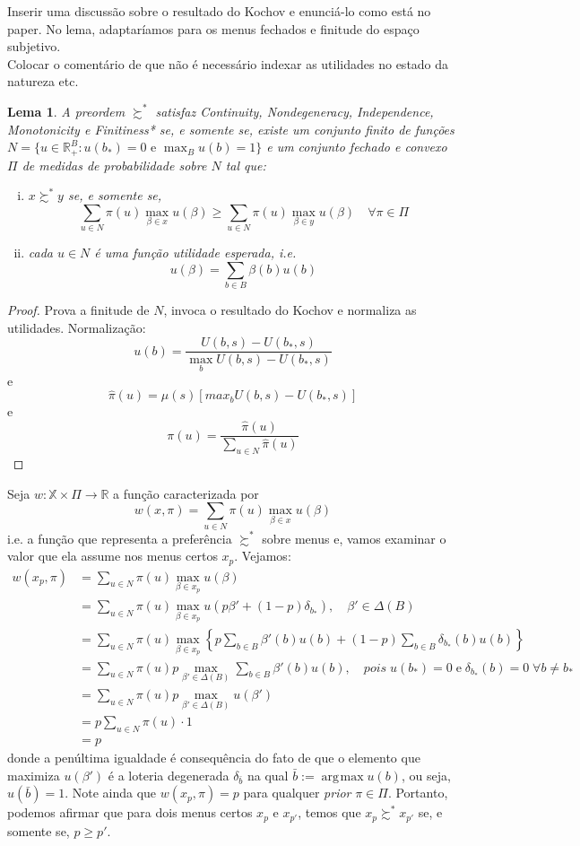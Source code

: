 \documentclass[11pt, a4paper]{article}
\theoremstyle{nonumberplain}
\newtheorem{proof}{Dem.}
\theoremstyle{plain}
\theoremstyle{plain}
\newtheorem{lemma}{Lema}
\DeclareMathOperator*{\argmax}{\arg\!\max}
\begin{document}
{\color{cadmiumgreen}Inserir uma discussão sobre o resultado do Kochov e enunciá-lo como está no paper. No lema, adaptaríamos para os menus fechados e finitude do espaço subjetivo.\\
Colocar o comentário de que não é necessário indexar as utilidades no estado da natureza etc.}


\begin{lemma} A preordem $\succsim^*$ satisfaz \emph{Continuity}, \emph{Nondegeneracy}, \emph{Independence}, \emph{Monotonicity} e \emph{Finitiness*} se, e somente se, existe um conjunto finito de funções $N=\{u \in \mathbb{R}^B_+:u(b_*)=0\text { e }\max_{B}u(b)=1\}$ e um conjunto fechado e convexo $\Pi$ de medidas de probabilidade sobre $N$ tal que:
\begin{enumerate}[(i)]
\item $x\succsim^* y$ se, e somente se, $$ \sum_{u\in N} \pi(u)\max_{\beta\in x}u(\beta) \geq \sum_{u\in N} \pi(u)\max_{\beta\in y}u(\beta)\quad \forall\pi\in\Pi$$  
\item cada $u \in N$ é uma função utilidade esperada, i.e. $$u(\beta)=\sum_{b\in B} \beta(b)u(b)$$ 
\end{enumerate}     
\end{lemma}
\begin{proof}
Prova a finitude de $N$, invoca o resultado do Kochov e normaliza as utilidades.
Normalização:$$u(b)=\frac{U(b,s)-U(b_*,s)}{\max_b U(b,s)-U(b_*,s)}$$ e $$ \hat{\pi}(u)=\mu(s)\left[max_b U(b,s)-U(b_*,s)\right]$$ e $$\pi(u)=\frac{\hat{\pi}(u)}{\sum_{u\in N}\hat{\pi}(u)}$$ 
\end{proof}

Seja $w:\mathbb{X}\times \Pi\rightarrow \mathbb{R}$ a função caracterizada por $$w(x,\pi)=\sum_{u\in N} \pi(u)\max_{\beta\in x}u(\beta)$$ i.e. a função que representa a preferência $\succsim^*$ sobre menus e, vamos examinar o valor que ela assume nos menus certos $x_p$. Vejamos:
\begin{align*}
w(x_p,\pi)&=\sum_{u\in N} \pi(u)\max_{\beta\in x_{p}}u(\beta)\\
&= \sum_{u\in N} \pi(u)\max_{\beta\in x_{p}}u(p\beta'+(1-p)\delta_{b_*}),\quad \beta'\in \Delta(B)\\
&=\sum_{u\in N} \pi(u)\max_{\beta\in x_{p}}\left\lbrace p \sum_{b\in B}\beta'(b)u(b)+(1-p)\sum_{b\in B}\delta_{b_*}(b)u(b)\right\rbrace \\
&=\sum_{u\in N} \pi(u)p\max_{\beta'\in \Delta(B)}\sum_{b\in B}\beta'(b)u(b), \quad pois \; u(b_*)=0\; \text{e}\; \delta_{b_*}(b)=0\; \forall b\neq b_*\\
&= \sum_{u\in N} \pi(u) p \max_{\beta'\in \Delta(B)} u(\beta')\\
&= p\sum_{u\in N}\pi(u)\cdot 1\\
&=p
\end{align*}
donde a penúltima igualdade é consequência do fato de que o elemento que maximiza $u(\beta')$ é a loteria degenerada $\delta_{\bar{b}}$ na qual $\bar{b}:=\argmax u(b)$, ou seja, $u(\bar{b})=1$. Note ainda que $w(x_p,\pi)=p$ para qualquer \textit{prior} $\pi\in\Pi$. Portanto, podemos afirmar que para dois menus certos $x_p$ e $x_{p'}$, temos que $x_p\succsim^* x_{p'}$ se, e somente se, $p\geq p'$. 
\end{document}
